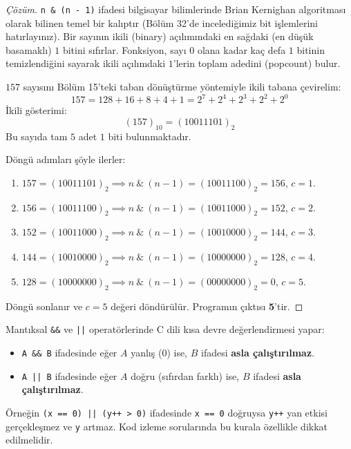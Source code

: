 \begin{proof}[Çözüm]
\texttt{n \& (n - 1)} ifadesi bilgisayar bilimlerinde Brian Kernighan algoritması olarak bilinen temel bir kalıptır (Bölüm 32'de incelediğimiz bit işlemlerini hatırlayınız). Bir sayının ikili (binary) açılımındaki en sağdaki (en düşük basamaklı) $1$ bitini sıfırlar. Fonksiyon, sayı $0$ olana kadar kaç defa $1$ bitinin temizlendiğini sayarak ikili açılımdaki $1$'lerin toplam adedini (popcount) bulur.

$157$ sayısını Bölüm 15'teki taban dönüştürme yöntemiyle ikili tabana çevirelim:
\[
157 = 128 + 16 + 8 + 4 + 1 = 2^7 + 2^4 + 2^3 + 2^2 + 2^0
\]
İkili gösterimi:
\[
(157)_{10} = (10011101)_2
\]
Bu sayıda tam $5$ adet $1$ biti bulunmaktadır.

Döngü adımları şöyle ilerler:
\begin{enumerate}
    \item $157 = (10011101)_2 \implies n \ \& \ (n-1) = (10011100)_2 = 156$, $c = 1$.
    \item $156 = (10011100)_2 \implies n \ \& \ (n-1) = (10011000)_2 = 152$, $c = 2$.
    \item $152 = (10011000)_2 \implies n \ \& \ (n-1) = (10010000)_2 = 144$, $c = 3$.
    \item $144 = (10010000)_2 \implies n \ \& \ (n-1) = (10000000)_2 = 128$, $c = 4$.
    \item $128 = (10000000)_2 \implies n \ \& \ (n-1) = (00000000)_2 = 0$, $c = 5$.
\end{enumerate}
Döngü sonlanır ve $c = 5$ değeri döndürülür. Programın çıktısı \textbf{5}'tir.
\end{proof}

\begin{definition}
Mantıksal \texttt{\&\&} ve \texttt{||} operatörlerinde C dili kısa devre değerlendirmesi yapar:
\begin{itemize}
    \item \texttt{A \&\& B} ifadesinde eğer $A$ yanlış ($0$) ise, $B$ ifadesi \textbf{asla çalıştırılmaz}.
    \item \texttt{A || B} ifadesinde eğer $A$ doğru (sıfırdan farklı) ise, $B$ ifadesi \textbf{asla çalıştırılmaz}.
\end{itemize}
Örneğin \texttt{(x == 0) || (y++ > 0)} ifadesinde \texttt{x == 0} doğruysa \texttt{y++} yan etkisi gerçekleşmez ve \texttt{y} artmaz. Kod izleme sorularında bu kurala özellikle dikkat edilmelidir.
\end{definition}

